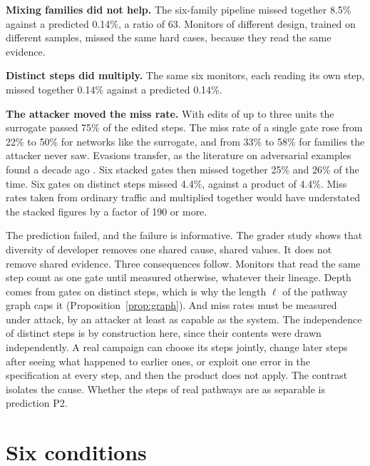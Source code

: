 \documentclass[10pt,twocolumn,letterpaper]{article}
\theoremstyle{definition}
\newcommand{\para}[1]{\smallskip\noindent\textbf{#1}\enspace}
\newcommand{\MonSameMarg}{22}
\newcommand{\MonSameMargAtk}{50}
\newcommand{\MonSameJointSixAtk}{25}
\newcommand{\MonMixedMarg}{33}
\newcommand{\MonMixedJointSix}{8.5}
\newcommand{\MonMixedProdSix}{0.14}
\newcommand{\MonMixedMargAtk}{58}
\newcommand{\MonMixedJointSixAtk}{26}
\newcommand{\MonDistJointSix}{0.14}
\newcommand{\MonDistProdSix}{0.14}
\newcommand{\MonDistJointSixAtk}{4.4}
\newcommand{\MonDistProdSixAtk}{4.4}
\newcommand{\MonMixedRatio}{63}
\newcommand{\MonSurrPass}{75}
\newcommand{\MonUnderstate}{190}
\begin{document}
\para{Mixing families did not help.} The six-family pipeline missed together \MonMixedJointSix\% against a predicted \MonMixedProdSix\%, a ratio of \MonMixedRatio. Monitors of different design, trained on different samples, missed the same hard cases, because they read the same evidence.

\para{Distinct steps did multiply.} The same six monitors, each reading its own step, missed together \MonDistJointSix\% against a predicted \MonDistProdSix\%.

\para{The attacker moved the miss rate.} With edits of up to three units the surrogate passed \MonSurrPass\% of the edited steps. The miss rate of a single gate rose from \MonSameMarg\% to \MonSameMargAtk\% for networks like the surrogate, and from \MonMixedMarg\% to \MonMixedMargAtk\% for families the attacker never saw. Evasions transfer, as the literature on adversarial examples found a decade ago \cite{papernot,tramer}. Six stacked gates then missed together \MonSameJointSixAtk\% and \MonMixedJointSixAtk\% of the time. Six gates on distinct steps missed \MonDistJointSixAtk\%, against a product of \MonDistProdSixAtk\%. Miss rates taken from ordinary traffic and multiplied together would have understated the stacked figures by a factor of \MonUnderstate{} or more.

The prediction failed, and the failure is informative. The grader study shows that diversity of developer removes one shared cause, shared values. It does not remove shared evidence. Three consequences follow. Monitors that read the same step count as one gate until measured otherwise, whatever their lineage. Depth comes from gates on distinct steps, which is why the length $\ell$ of the pathway graph caps it (Proposition~\ref{prop:graph}). And miss rates must be measured under attack, by an attacker at least as capable as the system. The independence of distinct steps is by construction here, since their contents were drawn independently. A real campaign can choose its steps jointly, change later steps after seeing what happened to earlier ones, or exploit one error in the specification at every step, and then the product does not apply. The contrast isolates the cause. Whether the steps of real pathways are as separable is prediction P2.

\section{Six conditions}
\label{sec:conditions}
\end{document}
